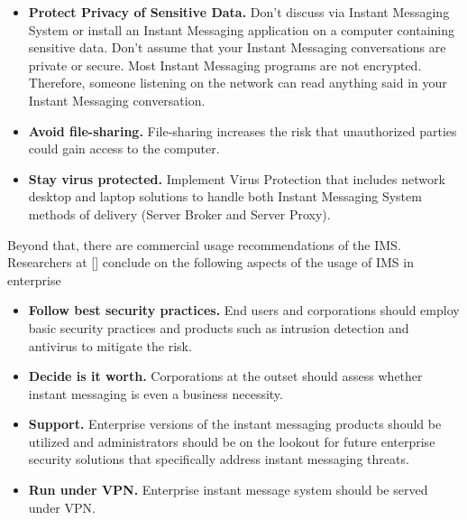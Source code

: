 \begin{itemize}
    \item \textbf{Protect Privacy of Sensitive Data.}
    Don't discuss via Instant Messaging System or install an Instant Messaging application on a computer containing
    sensitive data.
    Don't assume that your Instant Messaging conversations are private or secure.
    Most Instant Messaging programs are not encrypted.
    Therefore, someone listening on the network can read anything said in your Instant Messaging conversation.
    \item \textbf{Avoid file-sharing.}
    File-sharing increases the risk that unauthorized parties could gain access to the computer.
    \item \textbf{Stay virus protected.} Implement Virus Protection that includes network desktop and laptop solutions to handle both Instant Messaging System
    methods of delivery (Server Broker and Server Proxy).
\end{itemize}

Beyond that, there are commercial usage recommendations of the IMS\@.
Researchers at [\cite{hindocha2003malicious}] conclude on the following aspects of the usage of IMS in enterprise
\begin{itemize}
    \item \textbf{Follow best security practices.}
    End users and corporations should employ basic security practices and products such as
    intrusion detection and antivirus to mitigate the risk.
    \item \textbf{Decide is it worth.}
    Corporations at the outset should assess whether instant messaging is even a business necessity.
    \item \textbf{Support.} Enterprise versions of
    the instant messaging products should be utilized and administrators should be on the lookout for
    future enterprise security solutions that specifically address instant messaging threats.
    \item \textbf{Run under VPN.} Enterprise instant message system should be served under VPN\@.
\end{itemize}